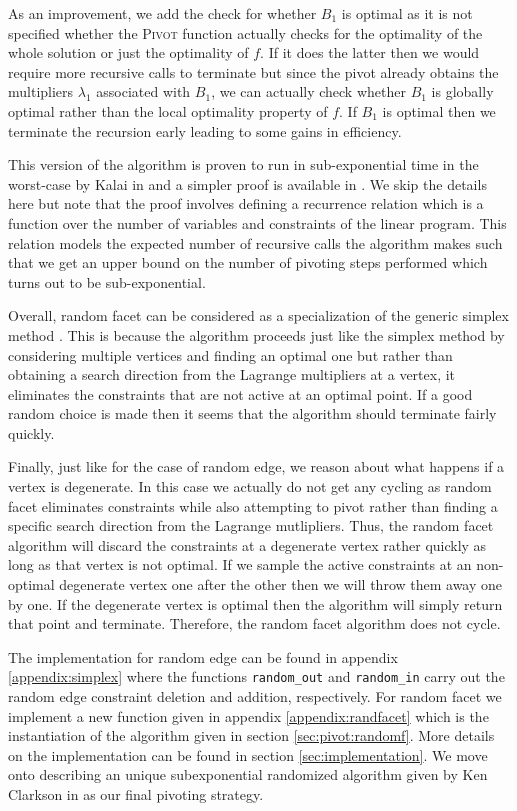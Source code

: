 \documentclass{standalone}
\begin{document}
{  As an improvement, we add the check for whether $B_{1}$ is optimal as it is not specified whether the \textsc{Pivot} function actually checks for the optimality of the whole solution or just the optimality of $f$. If it does the latter then we would require more recursive calls to terminate but since the pivot already obtains the multipliers $\lambda_{1}$ associated with $B_{1}$, we can actually check whether $B_{1}$ is globally optimal rather than the local optimality property of $f$. If $B_{1}$ is optimal then we terminate the recursion early leading to some gains in efficiency.\par
  This version of the algorithm is proven to run in sub-exponential time in the worst-case by Kalai in \cite{kalai1992subexponential} and a simpler proof is available in \cite{hansen2015improved}. We skip the details here but note that the proof involves defining a recurrence relation which is a function over the number of variables and constraints of the linear program. This relation models the expected number of recursive calls the algorithm makes such that we get an upper bound on the number of pivoting steps performed which turns out to be sub-exponential.\par
  Overall, random facet can be considered as a specialization of the generic simplex method \cite{hansen2015improved}. This is because the algorithm proceeds just like the simplex method by considering multiple vertices and finding an optimal one but rather than obtaining a search direction from the Lagrange multipliers at a vertex, it eliminates the constraints that are not active at an optimal point. If a good random choice is made then it seems that the algorithm should terminate fairly quickly.\par
  Finally, just like for the case of random edge, we reason about what happens if a vertex is degenerate. In this case we actually do not get any cycling as random facet eliminates constraints while also attempting to pivot rather than finding a specific search direction from the Lagrange mutlipliers. Thus, the random facet algorithm will discard the constraints at a degenerate vertex rather quickly as long as that vertex is not optimal. If we sample the active constraints at an non-optimal degenerate vertex one after the other then we will throw them away one by one. If the degenerate vertex is optimal then the algorithm will simply return that point and terminate. Therefore, the random facet algorithm does not cycle.\par
}
The implementation for random edge can be found in appendix \ref{appendix:simplex} where the functions \verb|random_out| and \verb|random_in| carry out the random edge constraint deletion and addition, respectively. For random facet we implement a new function given in appendix \ref{appendix:randfacet} which is the instantiation of the algorithm given in section \ref{sec:pivot:randomf}. More details on the implementation can be found in section \ref{sec:implementation}. We move onto describing an unique subexponential randomized algorithm given by Ken Clarkson in \cite{clarkson1995vegas} as our final pivoting strategy.
\end{document}
